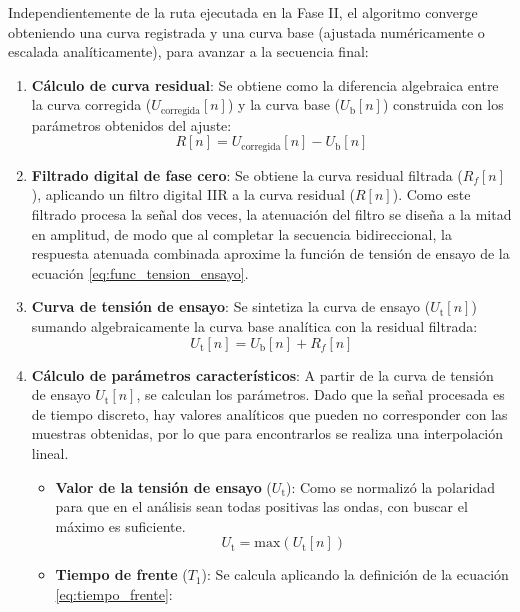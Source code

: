 Independientemente de la ruta ejecutada en la Fase II, el algoritmo converge obteniendo una curva registrada y una curva base (ajustada numéricamente o escalada analíticamente), para avanzar a la secuencia final:
\begin{enumerate}[resume]
    \item \textbf{Cálculo de curva residual}: Se obtiene como la diferencia algebraica entre la curva corregida ($U_{\text{corregida}}[n]$) y la curva base ($U_\text{b}[n]$) construida con los parámetros obtenidos del ajuste:
    \begin{equation}
        R[n] = U_{\text{corregida}}[n] - U_\text{b}[n]
        \label{eq:curva_residual}
    \end{equation}
    \item \textbf{Filtrado digital de fase cero}: 
    Se obtiene la curva residual filtrada ($R_f[n]$), aplicando un filtro digital IIR a la curva residual ($R[n]$). Como este filtrado procesa la señal dos veces, la atenuación del filtro se diseña a la mitad en amplitud, de modo que al completar la secuencia bidireccional, la respuesta atenuada combinada aproxime la función de tensión de ensayo de la ecuación \ref{eq:func_tension_ensayo}.
    \item \textbf{Curva de tensión de ensayo}: Se sintetiza la curva de ensayo ($U_\text{t}[n]$) sumando algebraicamente la curva base analítica con la residual filtrada:
    \begin{equation}
        U_\text{t}[n] = U_\text{b}[n] + R_f[n]
        \label{eq:curva_ensayo}
    \end{equation}
    \item \textbf{Cálculo de parámetros característicos}: A partir de la curva de tensión de ensayo $U_\text{t}[n]$, se calculan los parámetros. Dado que la señal procesada es de tiempo discreto, hay valores analíticos que pueden no corresponder con las muestras obtenidas, por lo que para encontrarlos se realiza una interpolación lineal.
    \begin{itemize}
        \item \textbf{Valor de la tensión de ensayo} ($U_\text{t}$): Como se normalizó la polaridad para que en el análisis sean todas positivas las ondas, con buscar el máximo es suficiente.
        \begin{equation}
            U_\text{t} = \text{max}(U_\text{t}[n])
            \label{eq:valor_cresta}
        \end{equation}
        \item \textbf{Tiempo de frente} ($T_1$): Se calcula aplicando la definición de la ecuación \ref{eq:tiempo_frente}:

\end{itemize}
\end{enumerate}
